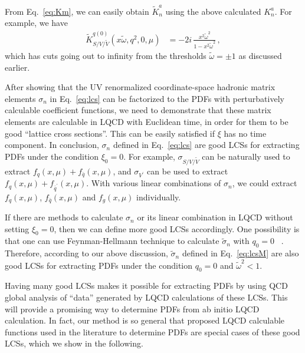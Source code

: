 \documentclass[twocolumn,aps,prl,superscriptaddress,nofootinbib,showpacs]{revtex4-1}
\newcommand{\sect}[1]{\noindent{\it \textbf{#1} ---}}
\begin{document}
From Eq.~\eqref{eq:Km}, we can easily obtain $\widetilde{K}_n^a$ using the above calculated $K_n^a$. For example, we have
\begin{align}\label{eq:KmS0}
\widetilde{K}^{q(0)}_{S/V/\widetilde{V}}(x \widetilde\omega,q^2,0,\mu)&=-2i\,\frac{x^2\widetilde\omega^{2}}{1-x^2\widetilde\omega^{2}}\, ,
\end{align}
which has cuts going out to infinity from the thresholds $\widetilde\omega=\pm 1$ as discussed earlier.

\sect{Good ``lattice cross sections"}
After showing that the UV renormalized coordinate-space hadronic matrix elements ${\sigma}_{n}$ in Eq.~\eqref{eq:lcs} can be factorized to the PDFs with perturbatively calculable coefficient functions, we need to demonstrate that these matrix elements are calculable in LQCD with Euclidean time, in order for them to be good ``lattice cross sections''.  This can be easily satisfied if $\xi$ has no time component. In conclusion,  ${\sigma}_{n}$ defined in Eq.~\eqref{eq:lcs} are good LCSs for extracting PDFs under the condition  $\xi_0=0$. For example,  ${\sigma}_{S/V/\widetilde{V}}$ can be naturally used to extract $f_{q}(x,\mu)+f_{\bar q}(x,\mu)$, and ${\sigma}_{V^\prime}$ can be used to extract $f_{q}(x,\mu)+f_{{\bar q}^\prime}(x,\mu)$. With various linear combinations of $\sigma_n$, we could extract $f_{q}(x,\mu)$, $f_{\bar q}(x,\mu)$ and $f_{g}(x,\mu)$ individually.

If there are methods to calculate ${\sigma}_{n}$ or its linear combination in LQCD without setting $\xi_0=0$, then we can define more good LCSs accordingly. One possibility is that one can use Feynman-Hellmann technique to calculate $\widetilde{\sigma}_{n}$ with $q_0=0$~\cite{Orginos:2017kos} . Therefore, according to our above discussion, $\widetilde{\sigma}_{n}$ defined in Eq.~\eqref{eq:lcsM} are also good LCSs for extracting PDFs under the condition $q_0=0$ and $\widetilde{\omega}^2<1$.

Having many good LCSs makes it possible for extracting PDFs by using QCD global analysis of ``data'' generated by LQCD calculations of these LCSs. This will provide a promising way to determine PDFs from ab initio LQCD calculation. In fact, our method is so general that proposed LQCD calculable functions used in the literature to determine PDFs are special cases of these good LCSs, which we show in the following.
\end{document}
